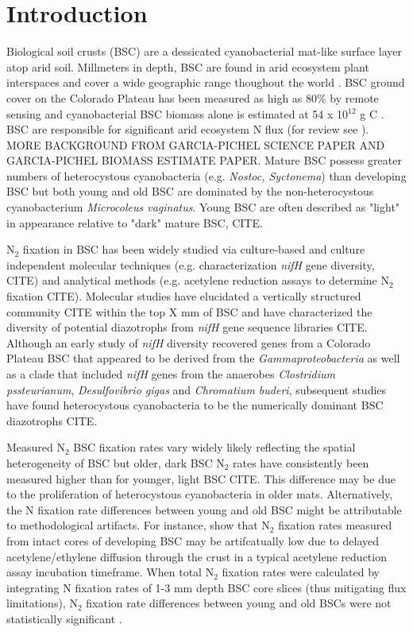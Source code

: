 \section{Introduction}


Biological soil crusts (BSC) are a dessicated cyanobacterial mat-like surface layer atop arid soil. Millmeters in depth, BSC are found in arid ecosystem plant interspaces and cover a wide geographic range thoughout the world \cite{garcia2003estimates}. BSC ground cover on the Colorado Plateau has been measured as high as 80\% by remote sensing \cite{karnieli2001} and cyanobacterial BSC biomass alone is estimated at 54 x 10$^{12}$ g C \cite{garcia2003estimates}. BSC are responsible for significant arid ecosystem N flux (for review see \citet{belnap2003}). MORE BACKGROUND FROM GARCIA-PICHEL SCIENCE PAPER AND GARCIA-PICHEL BIOMASS ESTIMATE PAPER. Mature BSC possess greater numbers of heterocystous cyanobacteria (e.g. \textit{Nostoc, Syctonema}) than developing BSC but both young and old BSC are dominated by the non-heterocystous cyanobacterium \textit{Microcoleus vaginatus}. Young BSC are often described as "light" in appearance relative to "dark" mature BSC, CITE.

N$_{2}$ fixation in BSC has been widely studied via culture-based and culture independent molecular techniques (e.g. characterization \textit{nifH} gene diversity, CITE) and analytical methods (e.g. acetylene reduction assays to determine N$_{2}$ fixation CITE). Molecular studies have elucidated a vertically structured community CITE within the top X mm of BSC and have characterized the diversity of potential diazotrophs from \textit{nifH} gene sequence libraries CITE. Although an early study of \textit{nifH} diversity recovered genes from a Colorado Plateau BSC that appeared to be derived from the \textit{Gammaproteobacteria} as well as a clade that included \textit{nifH} genes from the anaerobes \textit{Clostridium pssteurianum}, \textit{Desulfovibrio gigas} and \textit{Chromatium buderi}, subsequent studies have found heterocystous cyanobacteria to be the numerically dominant BSC diazotrophs CITE. 

Measured N$_{2}$ BSC fixation rates vary widely likely reflecting the spatial heterogeneity of BSC but older, dark BSC N$_{2}$ rates have consistently been measured higher than for younger, light BSC CITE. This difference may be due to the proliferation of heterocystous cyanobacteria in older mats. Alternatively, the N fixation rate differences between young and old BSC might be attributable to methodological artifacts. For instance, \citet{15643930} show that N$_{2}$ fixation rates measured from intact cores of developing BSC may be artifcatually low due to delayed acetylene/ethylene diffusion through the crust in a typical acetylene reduction assay incubation timeframe. When total N$_{2}$ fixation rates were calculated by integrating N fixation rates of 1-3 mm depth BSC core slices (thus mitigating flux limitations), N$_{2}$ fixation rate differences between young and old BSCs were not statistically significant \cite{15643930}.

